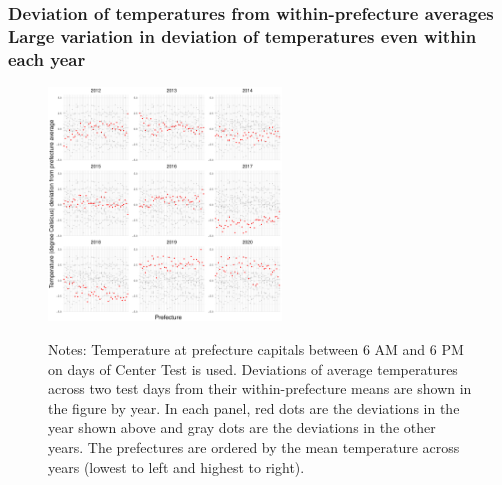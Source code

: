 \documentclass[10pt, pdfmx,hiresbb]{beamer}
\begin{document}
\begin{frame}\frametitle{Deviation of temperatures from within-prefecture averages \\ {\small Large variation in deviation of temperatures even within each year}} 
  \label{temp_dev_2}
  \begin{center}
    \begin{figure}
      \includegraphics[width=6.2cm]{../Output/images/temperature_diff_by_year.pdf}
      \tiny
      \begin{tablenotes}
      \item Notes:
        Temperature at prefecture capitals between 6 AM and 6 PM on days of Center Test is used.
        Deviations of average temperatures across two test days from their within-prefecture means are shown in the figure by year.
        In each panel, red dots are the deviations in the year shown above and gray dots are the deviations in the other years.
        The prefectures are ordered by the mean temperature across years (lowest to left and highest to right). \\
      \item 
        \hyperlink{est_eq}{}
      \end{tablenotes}
    \end{figure}
  \end{center}
\end{frame}
\end{document}
